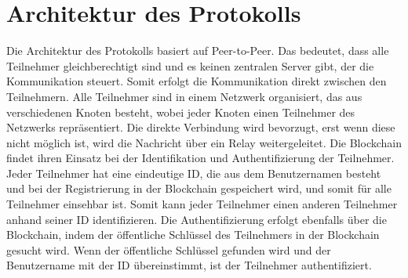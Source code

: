 \chapter{Architektur des Protokolls}
\label{chap:entwurf_und_architektur}



Die Architektur des Protokolls basiert auf Peer-to-Peer. Das bedeutet, dass alle Teilnehmer gleichberechtigt sind und es keinen zentralen Server gibt, der die Kommunikation steuert. Somit erfolgt die Kommunikation direkt zwischen den Teilnehmern. Alle Teilnehmer sind in einem Netzwerk organisiert, das aus verschiedenen Knoten besteht, wobei jeder Knoten einen Teilnehmer des Netzwerks repräsentiert. Die direkte Verbindung wird bevorzugt, erst wenn diese nicht möglich ist, wird die Nachricht über ein Relay weitergeleitet. Die Blockchain findet ihren Einsatz bei der Identifikation und Authentifizierung der Teilnehmer. Jeder Teilnehmer hat eine eindeutige ID, die aus dem Benutzernamen besteht und bei der Registrierung in der Blockchain gespeichert wird, und somit für alle Teilnehmer einsehbar ist. Somit kann jeder Teilnehmer einen anderen Teilnehmer anhand seiner ID identifizieren. Die Authentifizierung erfolgt ebenfalls über die Blockchain, indem der öffentliche Schlüssel des Teilnehmers in der Blockchain gesucht wird. Wenn der öffentliche Schlüssel gefunden wird und der Benutzername mit der ID übereinstimmt, ist der Teilnehmer authentifiziert. 





